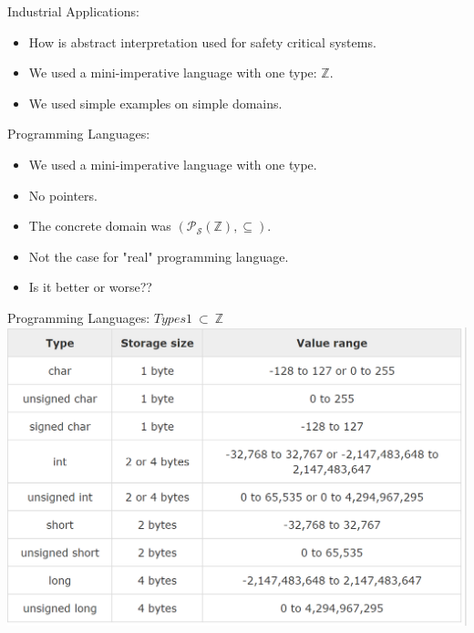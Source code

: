 \begin{frame}{Industrial Applications:}
\begin{itemize}
	\item How is abstract interpretation used for safety critical systems.
	\item We used a mini-imperative language with one type: $\mathbb{Z}$.
	\item We used simple examples on simple domains.
\end{itemize}
\end{frame}

\begin{frame}{Programming Languages:}
\begin{itemize}
	\item We used a mini-imperative language with one type.
	\item No pointers.
	\item The concrete domain was $(\mathcal{P_S}(\mathbb{Z}),\subseteq)$.
	\item Not the case for "real" programming language.
	\item Is it better or worse??
	\end{itemize}
\end{frame}

\begin{frame}{Programming Languages: $Types 1~\subset~\mathbb{Z}$}
\centering \includegraphics[scale=0.45]{content/images/static-analysis/int.png}
\end{frame}


